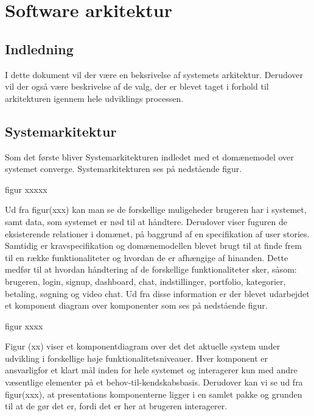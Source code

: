 \chapter{Software arkitektur}

\section{Indledning}

I dette dokument vil der være en beksrivelse af systemets arkitektur. 
Derudover vil der også være beskrivelse af de valg, der er blevet taget i forhold til arkitekturen igennem hele udviklings processen. 

\section{Systemarkitektur}
Som det første bliver Systemarkitekturen indledet med et domænemodel over systemet converge. Systemarkitekturen ses på nedstående figur.

figur xxxxx

Ud fra figur(xxx) kan man se de forskellige muligeheder brugeren har i systemet, samt data, som systemet er nød til at håndtere. Derudover viser fuguren  de eksisterende relationer i domænet, på baggrund af en specifikation af user stories. 
Samtidig er kravspecifikation og domænemodellen blevet brugt til at finde frem til en række funktionaliteter og hvordan de er afhængige af hinanden. Dette medfør til at hvordan håndtering af de forskellige funktionaliteter sker, såsom: brugeren, login, signup, dashboard, chat, indstillinger, portfolio, kategorier, betaling, søgning og video chat. Ud fra disse information er der blevet udarbejdet et komponent diagram over komponenter som ses på nedstående figur.

figur xxxx

Figur (xx) viser et komponentdiagram over det det aktuelle system under udvikling i forskellige høje funktionalitetsniveauer. Hver komponent er ansvarligfor et klart mål inden for hele systemet og interagerer kun med andre væsentlige elementer på et behov-til-kendskabsbasis. Derudover kan vi se ud fra figur(xxx), at presentations komponenterne ligger i en samlet pakke og grunden til at de gør det er, fordi det er her at brugeren interagerer.
